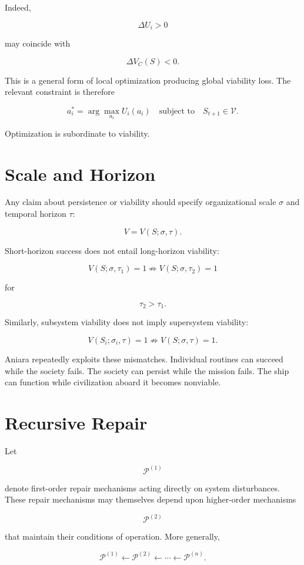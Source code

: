 \documentclass[11pt,oneside]{book}
\theoremstyle{definition}
\theoremstyle{remark}
\begin{document}
Indeed,

\[
\Delta U_i>0
\]

may coincide with

\[
\Delta V_C(S)<0.
\]

This is a general form of local optimization producing global viability loss. The relevant
constraint is therefore

\[
a_i^* = \arg\max_{a_i} U_i(a_i) \quad \text{subject to} \quad S_{t+1}\in\mathcal{V}.
\]

Optimization is subordinate to viability.

\section{Scale and Horizon}

Any claim about persistence or viability should specify organizational scale \(\sigma\) and temporal
horizon \(\tau\):

\[
V=V(S;\sigma,\tau).
\]

Short-horizon success does not entail long-horizon viability:

\[
V(S;\sigma,\tau_1)=1 \not\Rightarrow V(S;\sigma,\tau_2)=1
\]

for

\[
\tau_2>\tau_1.
\]

Similarly, subsystem viability does not imply supersystem viability:

\[
V(S_i;\sigma_i,\tau)=1 \not\Rightarrow V(S;\sigma,\tau)=1.
\]

Aniara repeatedly exploits these mismatches. Individual routines can succeed while the society
fails. The society can persist while the mission fails. The ship can function while civilization
aboard it becomes nonviable.

\section{Recursive Repair}

Let

\[
\mathcal{P}^{(1)}
\]

denote first-order repair mechanisms acting directly on system disturbances. These repair mechanisms
may themselves depend upon higher-order mechanisms

\[
\mathcal{P}^{(2)}
\]

that maintain their conditions of operation. More generally,

\[
\mathcal{P}^{(1)} \leftarrow \mathcal{P}^{(2)} \leftarrow \cdots \leftarrow \mathcal{P}^{(n)}.
\]
\end{document}
